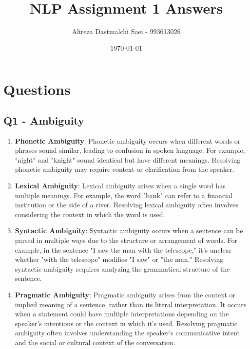 \documentclass{article}
\title{NLP Assignment 1 Answers}
\author{Alireza Dastmalchi Saei - 993613026}
\date{\today}
\begin{document}
\maketitle

\section{Questions}
\subsection{Q1 - Ambiguity}
\begin{enumerate}
    \item \textbf{Phonetic Ambiguity}: Phonetic ambiguity occurs when different words or phrases sound similar, leading to confusion in spoken language. For example, "night" and "knight" sound identical but have different meanings. Resolving phonetic ambiguity may require context or clarification from the speaker.

    \item \textbf{Lexical Ambiguity}: Lexical ambiguity arises when a single word has multiple meanings. For example, the word "bank" can refer to a financial institution or the side of a river. Resolving lexical ambiguity often involves considering the context in which the word is used.

    \item \textbf{Syntactic Ambiguity}: Syntactic ambiguity occurs when a sentence can be parsed in multiple ways due to the structure or arrangement of words. For example, in the sentence "I saw the man with the telescope," it's unclear whether "with the telescope" modifies "I saw" or "the man." Resolving syntactic ambiguity requires analyzing the grammatical structure of the sentence.

    \item \textbf{Pragmatic Ambiguity}: Pragmatic ambiguity arises from the context or implied meaning of a sentence, rather than its literal interpretation. It occurs when a statement could have multiple interpretations depending on the speaker's intentions or the context in which it's used. Resolving pragmatic ambiguity often involves understanding the speaker's communicative intent and the social or cultural context of the conversation.
\end{enumerate}
\end{document}
